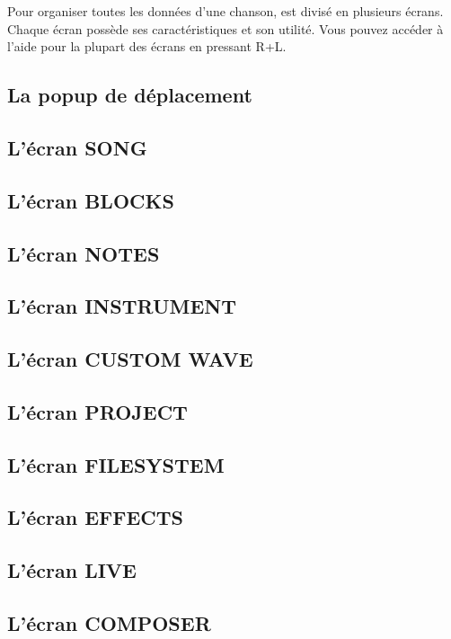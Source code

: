 Pour organiser toutes les données d'une chanson, \FAT est divisé en plusieurs écrans.
Chaque écran possède ses caractéristiques et son utilité.
Vous pouvez accéder à l'aide pour la plupart des écrans en pressant R+L.

\subsection{La popup de déplacement}


\subsection{L'écran SONG}


\subsection{L'écran BLOCKS}


\subsection{L'écran NOTES}


\subsection{L'écran INSTRUMENT}


\subsection{L'écran CUSTOM WAVE}


\subsection{L'écran PROJECT}


\subsection{L'écran FILESYSTEM}\label{filesystem}


\subsection{L'écran EFFECTS}


\subsection{L'écran LIVE}


\subsection{L'écran COMPOSER}

